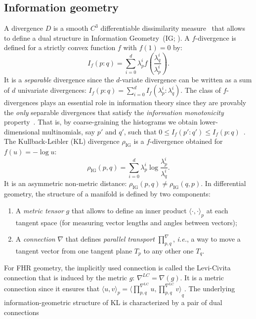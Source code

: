 \documentclass[graybox]{svmult}
\def\LC{\mathrm{LC}}
\def\Finner#1#2#3{{\langle {#1},{#2} \rangle}_{#3}}
\def\IG{\mathrm{IG}}
\begin{document}
\subsection{Information geometry}

A divergence $D$ is a smooth $C^3$ differentiable dissimilarity measure~\cite{DivIG-2010}
that allows to define a dual structure in Information Geometry~(IG; \cite{HessianStructure-2007,IG-2014,IG-2016}).
A $f$-divergence is defined for a strictly convex function $f$ with $f(1)=0$ by:
$$
I_f(p:q)=\sum_{i=0}^{d} \lambda_p^i f\left(\frac{\lambda_q^i}{\lambda_p^i}\right). 
$$
It is a {\em separable} divergence since the $d$-variate divergence can be written as a sum of $d$ univariate divergences: 
$I_f(p:q)=\sum_{i=0}^{d} I_f( \lambda_p^i: \lambda_q^i)$.
The class of $f$-divergences plays an essential role in information theory since they are provably the {\em only} separable divergences that satisfy
 the {\em information monotonicity} property~\cite{IG-2016,SeparableDivergence-2016}. 
That is, by coarse-graining the histograms  
we obtain lower-dimensional multinomials, say $p'$ and $q'$, such that $0\leq I_f(p':q')\leq  I_f(p:q)$~\cite{IG-2016}.
The Kullback-Leibler (KL) divergence $\rho_{\IG}$ is a $f$-divergence obtained for $f(u)=-\log u$:
\begin{equation}
\rho_{\IG}(p,q) = \sum_{i=0}^d \lambda_p^i \log\frac{\lambda_p^i}{\lambda_q^i}.
\end{equation}
It is an asymmetric non-metric distance: $\rho_{\IG}(p,q)\not =\rho_{\IG}(q,p)$.
In differential geometry, the structure of a manifold is defined by two components: 
\begin{enumerate}
\item A {\em metric tensor} $g$ that allows to define an inner product $\Finner{\cdot}{\cdot}{p}$ at each tangent space (for measuring vector lengths and angles between vectors); 
\item A {\em connection} $\nabla$ that defines 
{\em parallel transport} $\prod_{p,q}^\nabla$, {\it i.e.}, a way to move a tangent vector from
one tangent plane $T_p$ to any other one $T_q$.
\end{enumerate}
For FHR geometry, the implicitly used connection is called the Levi-Civita connection that is induced by the metric $g$: $\nabla^{LC}=\nabla(g)$.
It is a metric connection since it ensures that $\Finner{u}{v}{p}=\Finner{\prod_{p,q}^{\nabla^\LC} u}{\prod_{p,q}^{\nabla^\LC} v}{q}$. 
The underlying information-geometric structure of KL is characterized by a pair of dual connections~\cite{IG-2016} 
\end{document}
